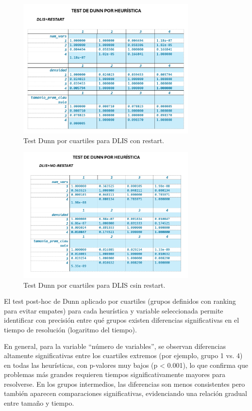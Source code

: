 \begin{figure}[ht]
    \centering
    \includegraphics[width=0.8\textwidth]{Graphics/test_dunn_dlis_restart.png}
    \caption{Test Dunn por cuartiles para DLIS con restart.}
    \label{fig:test-dunn-dlis-restart}
\end{figure}

\begin{figure}[ht]
    \centering
    \includegraphics[width=0.8\textwidth]{Graphics/test_dunn_dlis_no_restart.png}
    \caption{Test Dunn por cuartiles para DLIS csin restart.}
    \label{fig:test-dunn-dlis-no-restart}
\end{figure}

El test post-hoc de Dunn aplicado por cuartiles (grupos definidos con ranking para evitar empates) para cada heurística y variable seleccionada permite identificar con precisión entre qué grupos existen diferencias significativas en el tiempo de resolución (logaritmo del tiempo).

En general, para la variable ``número de variables'', se observan diferencias altamente significativas entre los cuartiles extremos (por ejemplo, grupo 1 vs. 4) en todas las heurísticas, con p-valores muy bajos (p < 0.001), lo que confirma que problemas más grandes requieren tiempos significativamente mayores para resolverse. En los grupos intermedios, las diferencias son menos consistentes pero también aparecen comparaciones significativas, evidenciando una relación gradual entre tamaño y tiempo. 

